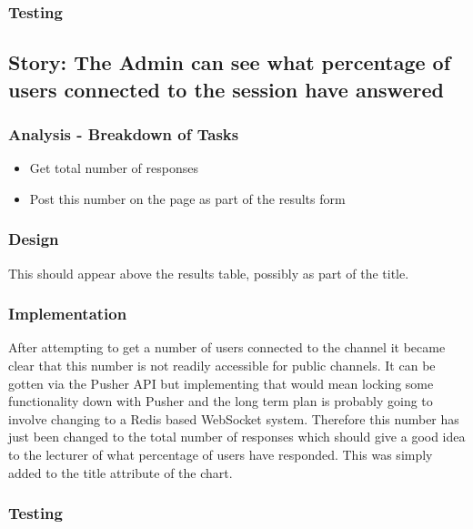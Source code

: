 \subsubsection{Testing}
\newpage

\subsection{Story: The Admin can see what percentage of users connected to the session have answered}
\subsubsection{Analysis - Breakdown of Tasks}
\begin{itemize}
	\item Get total number of responses
	\item Post this number on the page as part of the results form
\end{itemize}
\subsubsection{Design}
This should appear above the results table, possibly as part of the title.
\subsubsection{Implementation}
After attempting to get a number of users connected to the channel it became clear that this number is not readily accessible for public channels. It can be gotten via the Pusher API but implementing that would mean locking some functionality down with Pusher and the long term plan is probably going to involve changing to a Redis based WebSocket system. Therefore this number has just been changed to the total number of responses which should give a good idea to the lecturer of what percentage of users have responded. This was simply added to the title attribute of the chart.
\subsubsection{Testing}
\newpage
